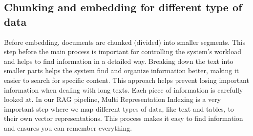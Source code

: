 \subsection{Chunking and embedding for different type of data}
Before embedding, documents are chunked (divided) into smaller segments. This step before the main process is important for controlling the system's workload and helps to find information in a detailed way. Breaking down the text into smaller parts helps the system find and organize information better, making it easier to search for specific content. This approach helps prevent losing important information when dealing with long texts. Each piece of information is carefully looked at.
\vskip 0.5cm
In our RAG pipeline, Multi Representation Indexing is a very important step where we map different types of data, like text and tables, to their own vector representations. This process makes it easy to find information and ensures you can remember everything.
